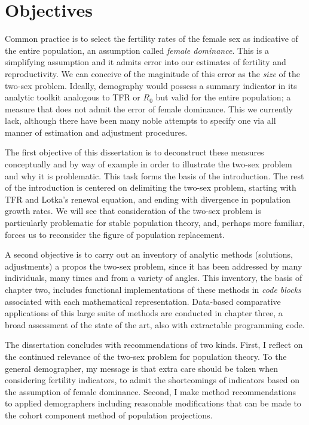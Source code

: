 \documentclass[reqno,12pt,oneside,a4paper]{report} %
\theoremstyle{plain}
\theoremstyle{definition}
\theoremstyle{remark}
\numberwithin{theorem}{chapter}     %
\begin{document}
\section{Objectives}

Common practice is to select the fertility rates of the female sex as indicative of the entire population, an assumption called \textit{female dominance}. This is a simplifying assumption and it admits error into our estimates of fertility and reproductivity. We can conceive of the maginitude of this error as the \textit{size} of the two-sex problem. Ideally, demography would possess a summary indicator in its analytic toolkit analogous to TFR or $R_0$ but valid for the entire population; a measure that does not admit the error of female dominance. This we currently lack, although there have been many noble attempts to specify one via all manner of estimation and adjustment procedures. 

The first objective of this dissertation is to deconstruct these measures conceptually and by way of example in order to illustrate the two-sex problem and why it is problematic. This task forms the basis of the introduction. The rest of the introduction is centered on delimiting the two-sex problem, starting with TFR and Lotka's renewal equation, and ending with divergence in population growth rates. We will see that consideration of the two-sex problem is particularly problematic for stable population theory, and, perhaps more familiar, forces us to reconsider the figure of population replacement.

A second objective is to carry out an inventory of analytic methods (solutions, adjustments) a propos the two-sex problem, since it has been addressed by many individuals, many times and from a variety of angles. This inventory, the basis of chapter two, includes functional implementations of these methods in \textit{code blocks} associated with each mathematical representation. Data-based comparative applications of this large suite of methods are conducted in chapter three, a broad assessment of the state of the art, also with extractable programming code. 

The dissertation concludes with recommendations of two kinds. First, I reflect on the continued relevance of the two-sex problem for population theory. To the general demographer, my message is that extra care should be taken when considering fertility indicators, to admit the shortcomings of indicators based on the assumption of female dominance. Second, I make method recommendations to applied demographers including reasonable modifications that can be made to the cohort component method of population projections.
\end{document}
